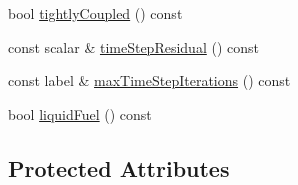 \begin{DoxyCompactItemize}
\item 
bool \hyperlink{classFoam_1_1multiphysicsControl_aa143142d0978efbc7d57e5b08f5a941b}{tightly\+Coupled} () const
\item 
const scalar \& \hyperlink{classFoam_1_1multiphysicsControl_a288322a24a6195966cc616b0cfc01760}{time\+Step\+Residual} () const
\item 
const label \& \hyperlink{classFoam_1_1multiphysicsControl_a528b923003af65d04bd5b33e3069e057}{max\+Time\+Step\+Iterations} () const
\item 
bool \hyperlink{classFoam_1_1multiphysicsControl_acdbd914add6a8c8c9a09276fa003206e}{liquid\+Fuel} () const
\end{DoxyCompactItemize}
\subsection*{Protected Attributes}
